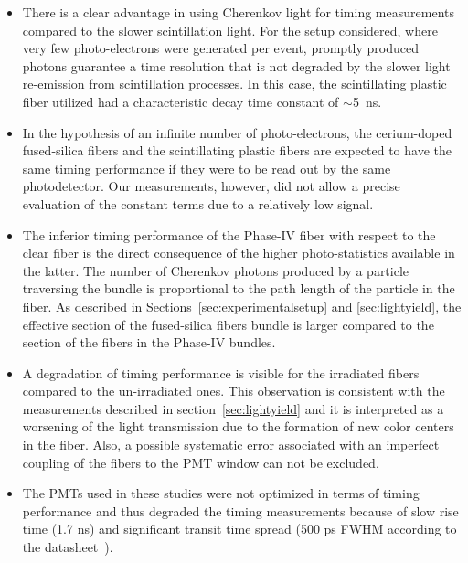 \documentclass[a4paper,11pt]{article}
\begin{document}
\begin{itemize}
\item There is a clear advantage in using Cherenkov light for timing measurements compared to the slower scintillation light. For the setup considered, where very few photo-electrons were generated per event, promptly produced photons guarantee a time resolution that is not degraded by the slower light re-emission from scintillation processes. In this case, the scintillating plastic fiber utilized had a characteristic decay time constant of $\sim$5~ns.
\item In the hypothesis of an infinite number of photo-electrons, the cerium-doped fused-silica fibers and the scintillating plastic fibers are expected to have the same timing performance if they were to be read out by the same photodetector. Our measurements, however, did not allow a precise evaluation of the constant terms due to a relatively low signal.
\item The inferior timing performance of the Phase-IV fiber with respect to the clear fiber is the direct consequence of the higher photo-statistics available in the latter. The number of Cherenkov photons produced by a particle traversing the bundle is proportional to the path length of the particle in the fiber. As described in Sections~\ref{sec:experimentalsetup} and \ref{sec:lightyield}, the effective section of the fused-silica fibers bundle is larger compared to the section of the fibers in the Phase-IV bundles.
\item A degradation of timing performance is visible for the irradiated fibers compared to the un-irradiated ones. This observation is consistent with the measurements described in section~\ref{sec:lightyield} and it is interpreted as a worsening of the light transmission due to the formation of new color centers in the fiber. Also, a possible systematic error associated with an imperfect coupling of the fibers to the PMT window can not be excluded.
\item The PMTs used in these studies were not optimized in terms of timing performance and thus degraded the timing measurements because of slow rise time (1.7 ns) and significant transit time spread (500 ps FWHM according to the datasheet~\cite{r-PMT}).
\end{itemize}
\end{document}
